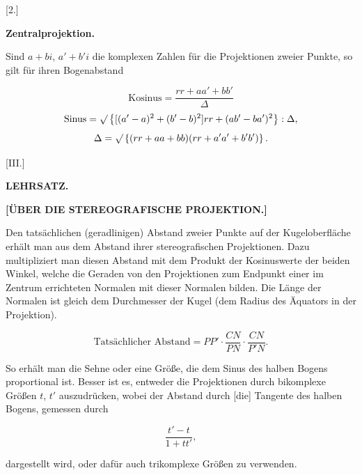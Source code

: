 
\begin{center}
[2.]
\end{center}

\begin{center}
\bfseries Zentralprojektion.
\end{center}

Sind $a+bi$, $a'+b'i$ die komplexen Zahlen für die Projektionen zweier Punkte, so gilt für ihren Bogenabstand

\[
\text{Kosinus} = \frac{rr+aa'+bb'}{\Delta}
\]
\[
\text{Sinus} = \mathord{\surd}\left\{[(a'-a)^2+(b'-b)^2]rr+(ab'-ba')^2\right\}:\Delta,
\]
\[
\Delta = \mathord{\surd}\left\{(rr+aa+bb)(rr+a'a'+b'b')\right\}.
\]

\begin{center}
[III.]
\end{center}

\begin{center}
\bfseries LEHRSATZ.
\end{center}

\begin{center}
\bfseries [ÜBER DIE STEREOGRAFISCHE PROJEKTION.]
\end{center}

Den tatsächlichen (geradlinigen) Abstand zweier Punkte auf der Kugeloberfläche erhält man aus dem Abstand ihrer stereografischen Projektionen. Dazu multipliziert man diesen Abstand mit dem Produkt der Kosinuswerte der beiden Winkel, welche die Geraden von den Projektionen zum Endpunkt einer im Zentrum errichteten Normalen mit dieser Normalen bilden. Die Länge der Normalen ist gleich dem Durchmesser der Kugel (dem Radius des Äquators in der Projektion).

\[
\text{Tatsächlicher Abstand} = PP'\cdot\frac{CN}{PN}\cdot\frac{CN}{P'N}.
\]

\begin{center}\end{center}
\indent So erhält man die Sehne oder eine Größe, die dem Sinus des halben Bogens proportional ist. Besser ist es, entweder die Projektionen durch bikomplexe Größen $t$, $t'$ auszudrücken, wobei der Abstand durch [die] Tangente des halben Bogens, gemessen durch

\[
\frac{t'-t}{1+tt'},
\]

\noindent dargestellt wird, oder dafür auch trikomplexe Größen zu verwenden.


